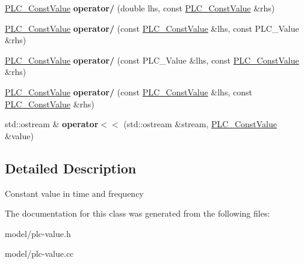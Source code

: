 \begin{DoxyCompactItemize}
\item 
\hypertarget{classns3_1_1PLC__ConstValue_ada720ccc7114d4030209d5f68b1f0767}{\hyperlink{classns3_1_1PLC__ConstValue}{\-P\-L\-C\-\_\-\-Const\-Value} {\bfseries operator/} (double lhs, const \hyperlink{classns3_1_1PLC__ConstValue}{\-P\-L\-C\-\_\-\-Const\-Value} \&rhs)}\label{classns3_1_1PLC__ConstValue_ada720ccc7114d4030209d5f68b1f0767}

\item 
\hypertarget{classns3_1_1PLC__ConstValue_a57402de7ab6ee016a347816f320e1471}{\hyperlink{classns3_1_1PLC__ConstValue}{\-P\-L\-C\-\_\-\-Const\-Value} {\bfseries operator/} (const \hyperlink{classns3_1_1PLC__ConstValue}{\-P\-L\-C\-\_\-\-Const\-Value} \&lhs, const \-P\-L\-C\-\_\-\-Value \&rhs)}\label{classns3_1_1PLC__ConstValue_a57402de7ab6ee016a347816f320e1471}

\item 
\hypertarget{classns3_1_1PLC__ConstValue_a7971c7fc5ad9e997f7d57cfd3947c840}{\hyperlink{classns3_1_1PLC__ConstValue}{\-P\-L\-C\-\_\-\-Const\-Value} {\bfseries operator/} (const \-P\-L\-C\-\_\-\-Value \&lhs, const \hyperlink{classns3_1_1PLC__ConstValue}{\-P\-L\-C\-\_\-\-Const\-Value} \&rhs)}\label{classns3_1_1PLC__ConstValue_a7971c7fc5ad9e997f7d57cfd3947c840}

\item 
\hypertarget{classns3_1_1PLC__ConstValue_abf8ec42e8ea610b0a2d6ef3e82395793}{\hyperlink{classns3_1_1PLC__ConstValue}{\-P\-L\-C\-\_\-\-Const\-Value} {\bfseries operator/} (const \hyperlink{classns3_1_1PLC__ConstValue}{\-P\-L\-C\-\_\-\-Const\-Value} \&lhs, const \hyperlink{classns3_1_1PLC__ConstValue}{\-P\-L\-C\-\_\-\-Const\-Value} \&rhs)}\label{classns3_1_1PLC__ConstValue_abf8ec42e8ea610b0a2d6ef3e82395793}

\item 
\hypertarget{classns3_1_1PLC__ConstValue_ae3331caf3979058a4791969f3f7985b7}{std\-::ostream \& {\bfseries operator$<$$<$} (std\-::ostream \&stream, \hyperlink{classns3_1_1PLC__ConstValue}{\-P\-L\-C\-\_\-\-Const\-Value} \&value)}\label{classns3_1_1PLC__ConstValue_ae3331caf3979058a4791969f3f7985b7}

\end{DoxyCompactItemize}


\subsection{\-Detailed \-Description}
\-Constant value in time and frequency 

\-The documentation for this class was generated from the following files\-:\begin{DoxyCompactItemize}
\item 
model/plc-\/value.\-h\item 
model/plc-\/value.\-cc\end{DoxyCompactItemize}
